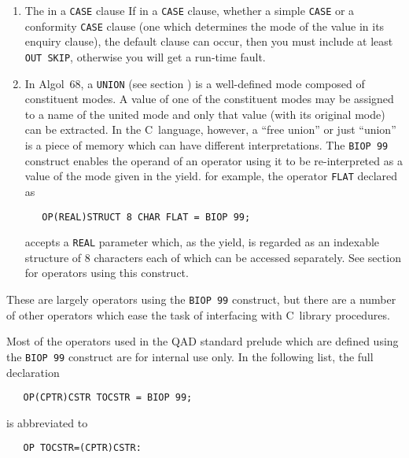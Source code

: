\begin{enumerate}
\item The  in a
\verb|CASE| clause\newline
If in a \verb|CASE| clause, whether a simple \verb|CASE| or a
conformity \verb|CASE| clause (one which determines the mode of the
value in its enquiry clause), the default clause can occur, then you
must include at least \verb|OUT SKIP|, otherwise you will get a
run-time fault.
\item {}\newline
In Algol~68, a \verb|UNION| (see section ) is a
well-defined mode composed of constituent modes. A value of one of the
constituent modes may be assigned to a name of the united mode and only
that value (with its original mode) can be extracted. In the
C~language, however, a ``free union'' or just ``union'' is a piece of
memory which can have different interpretations. The \verb|BIOP 99|
construct enables the operand of an operator using it to be
re-interpreted as a value of the mode given in the yield. for example,
the operator \verb|FLAT| declared as
\begin{verbatim}
   OP(REAL)STRUCT 8 CHAR FLAT = BIOP 99;
\end{verbatim}
\noindent
accepts a \verb|REAL| parameter which, as the yield, is regarded as an
indexable structure of 8 characters each of which can be accessed
separately. See section  for operators using this
construct.
\end{enumerate}

These are largely operators using the \verb|BIOP 99| construct, but
there are a number of other operators which ease the task of
interfacing with C~library procedures.

Most of the operators used in the QAD standard prelude which are
defined using the \verb|BIOP 99| construct are for internal use only.
In the following list, the full declaration
\begin{verbatim}
   OP(CPTR)CSTR TOCSTR = BIOP 99;
\end{verbatim}
\noindent
is abbreviated to
\begin{verbatim}
   OP TOCSTR=(CPTR)CSTR:
\end{verbatim}

